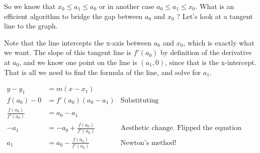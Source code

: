 \documentclass[12pt]{article}
\begin{document}
\begin{center}

\end{center}


So we know that $x_0\leq a_1\leq a_0$ or in another case $a_0\leq a_1\leq x_0$. What is an efficient algorithm to bridge the gap between $a_0$ and $x_0$ ? Let's look at a tangent line to the graph.

\begin{center}

\end{center}


Note that the line intercepts the x-axis between $a_0$ and $x_0$, which is exactly what we want. The slope of this tangent line is $f'(a_0)$ by definition of the derivative at $a_0$, and we know one point on the line is $(a_1,0)$, since that is the x-intercept. That is all we need to find the formula of the line, and solve for $a_1$.

\begin{align*}
y-y_1 &= m ( x - x_1 ) &\\
f(a_0)-0 &= f'(a_0)(a_0-a_1)& \text{Substituting}\\
\frac{f(a_0)}{f'(a_0)}&=a_0-a_1 &\\
-a_1 &= -a_0 + \frac{f(a_0)}{f'(a_0)} & \text{Aesthetic change. Flipped the equation around.}\\
a_1 &= a_0 - \frac{f(a_0)}{f'(a_0)} & \text{Newton's method!}
\end{align*}
\end{document}
